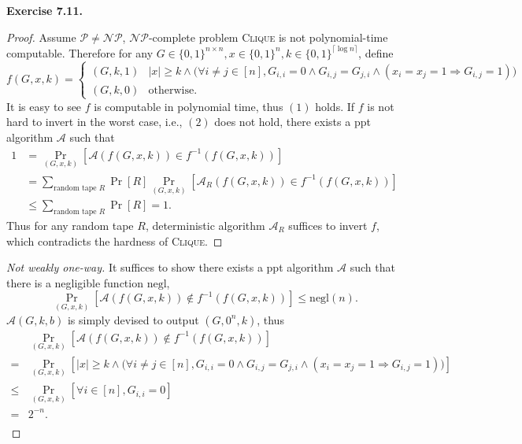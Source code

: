 \documentclass[a4paper]{article}
\newtheorem*{proof}{Proof}
\newenvironment{exercise}[1]{
	\par
	\noindent\textbf{Exercise #1.}\quad
}{
	\par
	\bigskip
}
\newcommand{\sbra}[1]{\left[ #1 \right]}
\newcommand{\bin}{\{0,1\}}
\newcommand{\negl}{\mathrm{negl}}
\newcommand{\ppt}{{\sc ppt} }
\newcommand{\Acal}{\mathcal{A}}
\begin{document}
\begin{exercise}{7.11}
\begin{itemize}
\begin{proof}
            Assume $\mathcal P\neq\mathcal{NP}$, $\mathcal{NP}$-complete problem \textsc{Clique} is not polynomial-time 
            computable. Therefore for any $G\in\bin^{n\times n},x\in\bin^n,k\in\bin^{\lceil\log n\rceil}$, define
            $$
            f(G,x,k)=\begin{cases}
                (G,k,1) & |x|\geq k\land\Big(\forall i\neq j\in[n],
                G_{i,i}=0\land G_{i,j}=G_{j,i}\land (x_i=x_j=1\Rightarrow G_{i,j}=1)\Big)\\
                (G,k,0) & \text{otherwise}.
            \end{cases}
            $$
            It is easy to see $f$ is computable in polynomial time, thus $(1)$ holds.
            If $f$ is not hard to invert in the worst case, i.e., $(2)$ does not hold, 
            there exists a \ppt algorithm $\Acal$ such that
            \begin{align*}
                1&=\Pr_{(G,x,k)}\sbra{\Acal(f(G,x,k))\in f^{-1}(f(G,x,k))}\\
                &=\sum_{\text{random tape }R}\Pr[R]\Pr_{(G,x,k)}\sbra{\Acal_R(f(G,x,k))\in f^{-1}(f(G,x,k))}\\
                &\leq\sum_{\text{random tape }R}\Pr[R]=1.
            \end{align*}
            Thus for any random tape $R$, deterministic algorithm $\Acal_R$ suffices to invert $f$, which
            contradicts the hardness of \textsc{Clique}.
        \end{proof}
        \begin{proof}[Not weakly one-way]
            It suffices to show there exists a \ppt algorithm $\Acal$ such that there is a negligible function $\negl$,
            $$
            \Pr_{(G,x,k)}\sbra{\Acal(f(G,x,k))\notin f^{-1}(f(G,x,k))}\leq\negl(n).
            $$
            $\Acal(G,k,b)$ is simply devised to output $(G,0^n,k)$, thus
            \begin{align*}
                &\Pr_{(G,x,k)}\sbra{\Acal(f(G,x,k))\notin f^{-1}(f(G,x,k))}\\
                =&\Pr_{(G,x,k)}\sbra{|x|\geq k\land\Big(\forall i\neq j\in[n],
                G_{i,i}=0\land G_{i,j}=G_{j,i}\land (x_i=x_j=1\Rightarrow G_{i,j}=1)\Big)}\\
                \leq&\Pr_{(G,x,k)}\sbra{\forall i\in[n],G_{i,i}=0}\\
                =&2^{-n}.\\
            \end{align*}
        \end{proof}
\end{itemize}
\end{exercise}
\end{document}
